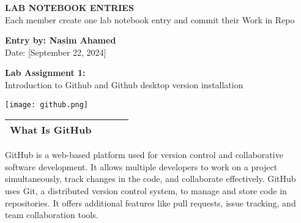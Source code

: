 \documentclass[a4paper,14pt]{article}
\begin{document}
\newpage

\pagestyle{fancy}
\fancyhf{}
\fancyfoot[C]{\thepage}

  {\normalfont\fontsize{24}{30}\bfseries}{}

\begin{center}
    \Huge \textbf{LAB NOTEBOOK ENTRIES} \\
    \vspace{10pt}
    \normalsize Each member create one lab notebook entry and commit their Work in Repo \\
    \vspace{30pt}
    
    \Large \textbf{Entry by: Nasim Ahamed} \\
    \normalsize Date: [September 22, 2024] \\
    \end{center}
    \vspace{30pt}
    
    \Large 
    \textbf{Lab Assignment 1:} \\
    Introduction to Github and Github desktop version installation \\
    \vspace{40pt}
    
    \begin{center}
    \texttt{[image: github.png]} \\ %
    \vspace{20pt}
    
    \begin{tabular}{|p{0.40\linewidth}|}
    \hline
    \huge \textbf{What Is GitHub} \\
    \hline
    \end{tabular}
    \end{center}
    \vspace{20pt}
    
    \normalsize 
    GitHub is a web-based platform used for version control and collaborative software development. 
    It allows multiple developers to work on a project simultaneously, track changes in the code, and collaborate effectively. 
    GitHub uses Git, a distributed version control system, to manage and store code in repositories. 
    It offers additional features like pull requests, issue tracking, and team collaboration tools.
    


\newpage
\end{document}
